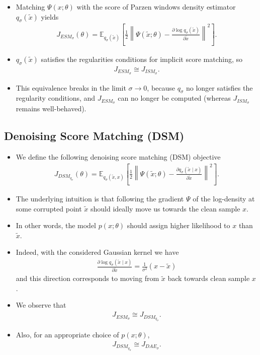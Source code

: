 \documentclass[10pt]{article}
\newcommand{\EE}{\mathbb{E}}
\newcommand{\DAE}{J_{DAE_\sigma}}
\newcommand{\ESMP}{J_{ESM_\sigma}}
\newcommand{\ISMP}{J_{ISM_\sigma}}
\newcommand{\DSM}{J_{DSM_{q_\sigma}}}
\begin{document}
\begin{itemize}
\item Matching $\Psi(x;\theta)$ with the score of Parzen windows density estimator $q_\sigma(\tilde{x})$ yields
\begin{align*}
\ESMP(\theta) = \EE_{q_\sigma(\tilde{x})} \left[ \frac{1}{2} \left\| \Psi(\tilde{x};\theta) - \frac{\partial \log q_\sigma(\tilde{x})}{\partial \tilde{x}} \right\|^2 \right].
\end{align*}
\item $q_\sigma(\tilde{x})$ satisfies the regularities conditions for implicit score matching, so
\begin{align*}
\ESMP \cong \ISMP.
\end{align*}
\item This equivalence breaks in the limit $\sigma \rightarrow 0$, because $q_\sigma$ no longer satisfies the regularity conditions, and $\ESMP$ can no longer be computed (whereas $\ISMP$ remains well-behaved).
\end{itemize}

\subsection{Denoising Score Matching (DSM)}

\begin{itemize}
\item We define the following denoising score matching (DSM) objective
\begin{align*}
\DSM(\theta) = \EE_{q_\sigma(\tilde{x},x)} \left[ \frac{1}{2} \left\| \Psi(\tilde{x};\theta) - \frac{\partial q_\sigma(\tilde{x} \mid x)}{\partial \tilde{x}} \right\|^2 \right].
\end{align*}
\item The underlying intuition is that following the gradient $\Psi$ of the log-density at some corrupted point $\tilde{x}$ should ideally move us towards the clean sample $x$.
\item In other words, the model $p(x;\theta)$ should assign higher likelihood to $x$ than $\tilde{x}$.
\item Indeed, with the considered Gaussian kernel we have
\begin{align*}
\frac{\partial \log q_\sigma(\tilde{x} \mid x)}{\partial \tilde{x}} = \frac{1}{\sigma^2} (x - \tilde{x})
\end{align*}
and this direction corresponds to moving from $\tilde{x}$ back towards clean sample $x$.
\item We observe that
\begin{align*}
\ESMP \cong \DSM.
\end{align*}
\item Also, for an appropriate choice of $p(x;\theta)$,
\begin{align*}
\DSM \cong \DAE.
\end{align*}
\end{itemize}
\end{document}
